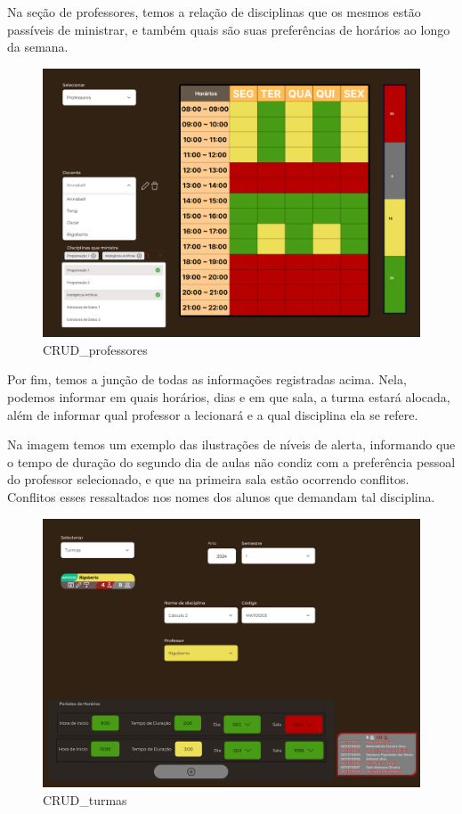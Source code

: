     Na seção de professores, temos a relação de disciplinas que os mesmos estão passíveis de ministrar, e também quais são suas preferências de horários ao longo da semana.

    \begin{figure}[htbp]\centering
        \caption{\label{fig:CRUD_professores} CRUD_professores}
        \includegraphics[scale=0.8]{files/img/Prototipo/CRUD_professores.png}
    \end{figure} %

    Por fim, temos a junção de todas as informações registradas acima. Nela, podemos informar em quais horários, dias e em que sala, a turma estará alocada, além de informar qual professor a lecionará e a qual disciplina ela se refere.

    Na imagem temos um exemplo das ilustrações de níveis de alerta, informando que o tempo de duração do segundo dia de aulas não condiz com a preferência pessoal do professor selecionado, e que na primeira sala estão ocorrendo conflitos. Conflitos esses ressaltados nos nomes dos alunos que demandam tal disciplina.

    \begin{figure}[htbp]\centering
        \caption{\label{fig:CRUD_turmas} CRUD_turmas}
        \includegraphics[scale=0.8]{files/img/Prototipo/CRUD_turmas.png}
    \end{figure} %

